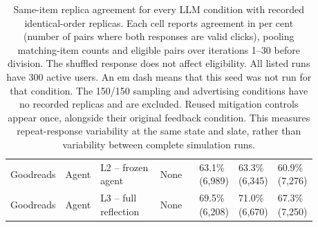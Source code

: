 \begin{table}[htbp!]
\begin{tabular}{p{0.11\linewidth}p{0.10\linewidth}p{0.20\linewidth}p{0.13\linewidth}p{0.115\linewidth}p{0.115\linewidth}p{0.115\linewidth}}
Goodreads & Agent & L2 -- frozen agent & None & 63.1\% (6,989) & 63.3\% (6,345) & 60.9\% (7,276) \\
Goodreads & Agent & L3 -- full reflection & None & 69.5\% (6,208) & 71.0\% (6,670) & 67.3\% (7,250) \\
\hline
\end{tabular}
\caption{Same-item replica agreement for every LLM condition with recorded identical-order replicas. Each cell reports agreement in per cent (number of pairs where both responses are valid clicks), pooling matching-item counts and eligible pairs over iterations 1--30 before division. The shuffled response does not affect eligibility. All listed runs have 300 active users. An em dash means that this seed was not run for that condition. The 150/150 sampling and advertising conditions have no recorded replicas and are excluded. Reused mitigation controls appear once, alongside their original feedback condition. This measures repeat-response variability at the same state and slate, rather than variability between complete simulation runs.}
\label{chap:results:tab:analysis_llm_replica_agreement_all_cases}
\end{table}
